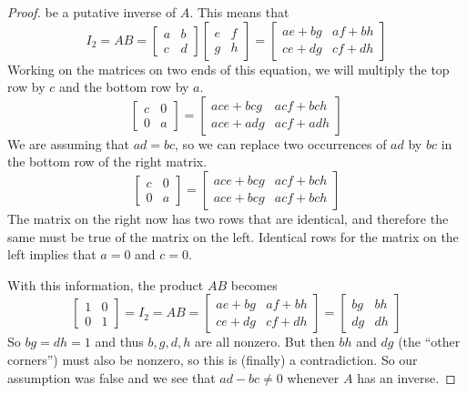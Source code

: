 \begin{proof}
%
be a putative inverse of $A$.  This means that
%
\begin{equation*}
I_2=AB=
\begin{bmatrix}
a&b\\
c&d
\end{bmatrix}
%
\begin{bmatrix}
e&f\\
g&h
\end{bmatrix}
=
\begin{bmatrix}
ae+bg & af+bh\\
ce+dg & cf+dh
\end{bmatrix}
\end{equation*}
%
Working on the matrices on two ends of this equation, we will multiply the top row by $c$ and the bottom row by $a$.
%
\begin{equation*}
\begin{bmatrix}
c&0\\
0&a
\end{bmatrix}
=
\begin{bmatrix}
ace+bcg & acf+bch\\
ace+adg & acf+adh
\end{bmatrix}
\end{equation*}
%
We are assuming that $ad=bc$, so we can replace two occurrences of $ad$ by $bc$ in the bottom row of the right matrix.
%
\begin{equation*}
\begin{bmatrix}
c&0\\
0&a
\end{bmatrix}
=
\begin{bmatrix}
ace+bcg & acf+bch\\
ace+bcg & acf+bch
\end{bmatrix}
\end{equation*}
%
The matrix on the right now has two rows that are identical, and therefore the same must be true of the matrix on the left.    Identical rows for the matrix on the left implies that $a=0$ and $c=0$.\par
%
With this information, the product $AB$ becomes
%
\begin{equation*}
\begin{bmatrix}
1 & 0\\
0 & 1
\end{bmatrix}
=I_2
=AB
=
\begin{bmatrix}
ae+bg & af+bh\\
ce+dg & cf+dh
\end{bmatrix}
=
\begin{bmatrix}
bg & bh\\
dg & dh
\end{bmatrix}
\end{equation*}
%
So $bg=dh=1$ and thus $b,g,d,h$ are all nonzero.  But then $bh$ and $dg$ (the ``other corners'') must also be nonzero, so this is (finally) a contradiction.   So our assumption was false and we see that $ad-bc\neq 0$ whenever $A$ has an inverse.
%
\end{proof}

